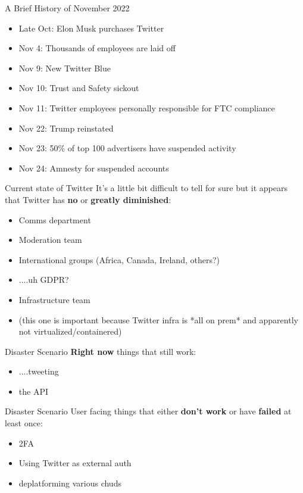 \documentclass{beamer}
\begin{document}
\begin{frame}{A Brief History of November 2022}
	\begin{itemize}
	\item Late Oct: Elon Musk purchases Twitter
	\item Nov 4: Thousands of employees are laid off
	\item Nov 9: New Twitter Blue
	\pause
	\item Nov 10: Trust and Safety sickout
	\pause
	\item Nov 11: Twitter employees personally responsible for FTC compliance
	\pause
	\item Nov 22: Trump reinstated
	\pause
	\item Nov 23: 50\% of top 100 advertisers have suspended activity
	\pause
	\item Nov 24: Amnesty for suspended accounts	
	
	\end{itemize}
\end{frame}

\begin{frame}{Current state of Twitter}
	It's a little bit difficult to tell for sure but it appears that Twitter has \textbf{no} or \textbf{greatly diminished}:
	\begin{itemize}
		\pause
		\item Comms department
		\pause
		\item Moderation team
		\pause
		\item International groups (Africa, Canada, Ireland, others?)
		\pause
		\item ....uh GDPR?
		\pause 
		\item Infrastructure team 
		\pause
		\item (this one is important because Twitter infra is *all on prem* and apparently not virtualized/containered)
	\end{itemize}
\end{frame}

\begin{frame}{Disaster Scenario}
	\textbf{Right now} things that still work:
	\begin{itemize}
		\pause
		\item ....tweeting
		\pause
		\item the API
	\end{itemize}
\end{frame}

\begin{frame}{Disaster Scenario}
	User facing things that either \textbf{don't work} or have \textbf{failed} at least once:
	\begin{itemize}
		\pause
		\item 2FA
		\pause
		\item Using Twitter as external auth
		\pause
		\item deplatforming various chuds
	\end{itemize}
\end{frame}
\end{document}
